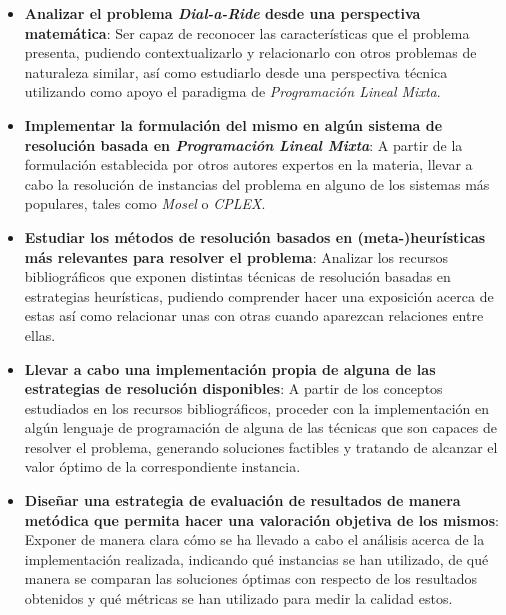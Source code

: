 \documentclass{subfiles}
\begin{document}
      \begin{itemize}

        \item \textbf{Analizar el problema \emph{Dial-a-Ride} desde una perspectiva matemática}: Ser capaz de reconocer las características que el problema presenta, pudiendo contextualizarlo y relacionarlo con otros problemas de naturaleza similar, así como estudiarlo desde una perspectiva técnica utilizando como apoyo el paradigma de \emph{Programación Lineal Mixta}.

        \item \textbf{Implementar la formulación del mismo en algún sistema de resolución basada en \emph{Programación Lineal Mixta}}: A partir de la formulación establecida por otros autores expertos en la materia, llevar a cabo la resolución de instancias del problema en alguno de los sistemas más populares, tales como \emph{Mosel} o \emph{CPLEX}.

        \item \textbf{Estudiar los métodos de resolución basados en (meta-)heurísticas más relevantes para resolver el problema}: Analizar los recursos bibliográficos que exponen distintas técnicas de resolución basadas en estrategias heurísticas, pudiendo comprender hacer una exposición acerca de estas así como relacionar unas con otras cuando aparezcan relaciones entre ellas.

        \item \textbf{Llevar a cabo una implementación propia de alguna de las estrategias de resolución disponibles}: A partir de los conceptos estudiados en los recursos bibliográficos, proceder con la implementación en algún lenguaje de programación de alguna de las técnicas que son capaces de resolver el problema, generando soluciones factibles y tratando de alcanzar el valor óptimo de la correspondiente instancia.

        \item \textbf{Diseñar una estrategia de evaluación de resultados de manera metódica que permita hacer una valoración objetiva de los mismos}: Exponer de manera clara cómo se ha llevado a cabo el análisis acerca de la implementación realizada, indicando qué instancias se han utilizado, de qué manera se comparan las soluciones óptimas con respecto de los resultados obtenidos y qué métricas se han utilizado para medir la calidad estos.

      \end{itemize}
\end{document}
